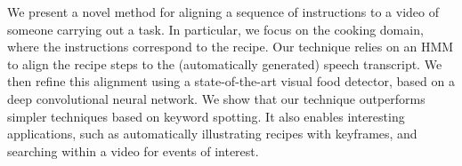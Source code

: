 We present a novel method for aligning a sequence of instructions to a video of someone carrying out a task. In particular, we focus on the cooking domain, where the instructions correspond to the recipe. Our technique relies on an HMM to align the recipe steps to the (automatically generated) speech transcript. We then refine this alignment using a state-of-the-art visual food detector, based on a deep convolutional neural network. We show that our technique outperforms simpler techniques based on keyword spotting. It also enables interesting applications, such as automatically illustrating recipes with keyframes, and searching within a video for events of interest.
